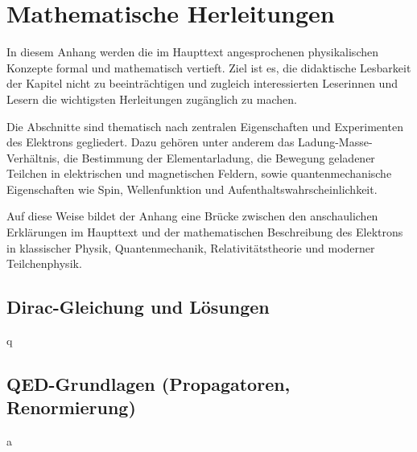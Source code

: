 
\cleardoublepage
\appendix
\setcounter{chapter}{0} %
\renewcommand{\thechapter}{\Alph{chapter}}
\renewcommand{\thesection}{\thechapter.\arabic{section}}
\renewcommand{\thesubsection}{\thesection.\arabic{subsection}}
\renewcommand{\thesubsubsection}{\thesubsection.\arabic{subsubsection}}

\renewcommand{\theHchapter}{app.\Alph{chapter}}
\renewcommand{\theHsection}{\theHchapter.\arabic{section}}
\renewcommand{\theHsubsection}{\theHsection.\arabic{subsection}}
\renewcommand{\theHsubsubsection}{\theHsubsection.\arabic{subsubsection}}
\chapter{Mathematische Herleitungen}
\label{app:mathematische-herleitungen}

In diesem Anhang werden die im Haupttext angesprochenen physikalischen Konzepte
formal und mathematisch vertieft. Ziel ist es, die didaktische Lesbarkeit der
Kapitel nicht zu beeinträchtigen und zugleich interessierten Leserinnen und Lesern
die wichtigsten Herleitungen zugänglich zu machen.

Die Abschnitte sind thematisch nach zentralen Eigenschaften und Experimenten des
Elektrons gegliedert. Dazu gehören unter anderem das
Ladung-Masse-Verhältnis, die Bestimmung der
Elementarladung, die Bewegung geladener Teilchen in
elektrischen und magnetischen Feldern,
sowie quantenmechanische Eigenschaften wie Spin, Wellenfunktion
und Aufenthaltswahrscheinlichkeit.

Auf diese Weise bildet der Anhang eine Brücke zwischen den anschaulichen Erklärungen
im Haupttext und der mathematischen Beschreibung des Elektrons in klassischer Physik,
Quantenmechanik, Relativitätstheorie
und moderner Teilchenphysik.




\section{Dirac-Gleichung und Lösungen}
q
\section{QED-Grundlagen (Propagatoren, Renormierung)}
a